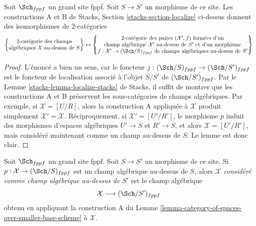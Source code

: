 \begin{lemma}
\label{lemma-category-of-spaces-over-smaller-base-scheme}
Soit $\Sch_{fppf}$ un grand site fppf.
Soit $S \to S'$ un morphisme de ce site.
Les constructions A et B de
Stacks, Section \ref{stacks-section-localize}
ci-dessus donnent des isomorphismes de $2$-catégories
$$
\left\{
\begin{matrix}
2\text{-catégorie des champs}\\
\text{algébriques }\mathcal{X}\text{ au-dessus de }S
\end{matrix}
\right\}
\leftrightarrow
\left\{
\begin{matrix}
2\text{-catégorie des paires }(\mathcal{X}', f)\text{ formées d'un}\\
\text{champ algébrique }\mathcal{X}'\text{ au-dessus de }S'\text{ et d'un morphisme}\\
f : \mathcal{X}' \to (\Sch/S)_{fppf}\text{ de champs algébriques au-dessus de }S'
\end{matrix}
\right\}
$$
\end{lemma}

\begin{proof}
L'énoncé a bien un sens, car le foncteur
$j : (\Sch/S)_{fppf} \to (\Sch/S')_{fppf}$
est le foncteur de localisation associé à l'objet $S/S'$
de $(\Sch/S')_{fppf}$. Par le
Lemme \ref{stacks-lemma-localize-stacks} de Stacks,
il suffit de montrer que les constructions A et B
préservent les sous-catégories de champs algébriques.
Par exemple, si $\mathcal{X} = [U/R]$, alors la construction A
appliquée à $\mathcal{X}$ produit simplement
$\mathcal{X}' = \mathcal{X}$. Réciproquement, si $\mathcal{X}' = [U'/R']$,
le morphisme $p$ induit des morphismes d'espaces algébriques
$U' \to S$ et $R' \to S$, et alors $\mathcal{X} = [U'/R']$,
mais considéré maintenant comme un champ au-dessus de $S$. Le lemme est donc clair.
\end{proof}

\begin{definition}
\label{definition-viewed-as}
Soit $\Sch_{fppf}$ un grand site fppf.
Soit $S \to S'$ un morphisme de ce site.
Si $p : \mathcal{X} \to (\Sch/S)_{fppf}$
est un champ algébrique au-dessus de $S$, alors
$\mathcal{X}$ {\it considéré comme champ algébrique au-dessus de $S'$}
est le champ algébrique
$$
\mathcal{X} \longrightarrow (\Sch/S')_{fppf}
$$
obtenu en appliquant la construction A du
Lemme \ref{lemma-category-of-spaces-over-smaller-base-scheme}
à $\mathcal{X}$.
\end{definition}

